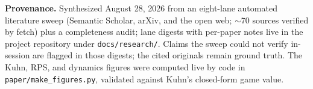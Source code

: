 \vspace{0.4em}
\textbf{Provenance.} Synthesized August 28, 2026 from an eight-lane automated literature sweep (Semantic Scholar, arXiv, and the open web; $\sim$70 sources verified by fetch) plus a completeness audit; lane digests with per-paper notes live in the project repository under \texttt{docs/research/}. Claims the sweep could not verify in-session are flagged in those digests; the cited originals remain ground truth. The Kuhn, RPS, and dynamics figures were computed live by code in \texttt{paper/make\_figures.py}, validated against Kuhn's closed-form game value.
